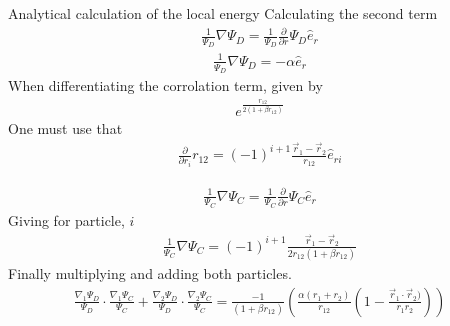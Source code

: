 \documentclass[a4paper, 12pt, titlepage]{article}
\begin{document}
\begin{section}{Analytical calculation of the local energy}
 Calculating the second term
 \begin{align*}
 	\frac{1}{\Psi_D} \nabla \Psi_D = \frac{1}{\Psi_D} \frac{\partial}{\partial r} \Psi_D \hat e_r 
 \end{align*}
 \begin{align}
 	\frac{1}{\Psi_D} \nabla \Psi_D = -\alpha \hat e_r
 \end{align}
 When differentiating the corrolation term, given by
 \begin{align*}
 	e^{\frac{r_{12}}{2\left(1 + \beta r_{12} \right)}}
 \end{align*}
 One must use that
 \begin{align}
 	\frac{\partial}{\partial r_i} r_{12} = (-1)^{i+1} \frac{\vec r_1 - \vec r_2}{r_{12}} \hat e_{ri}
 \end{align}

 \begin{align*}
 	\frac{1}{\Psi_C} \nabla \Psi_C = \frac{1}{\Psi_C} \frac{\partial}{\partial r} \Psi_C \hat e_r 
 \end{align*}
 Giving for particle, $i$
 \begin{align*}
 	\frac{1}{\Psi_C} \nabla \Psi_C = (-1)^{i+1} \frac{\vec r_1 - \vec r_2}{2r_{12} \left(1+\beta r_{12} \right)}
 \end{align*}
 Finally multiplying and adding both particles. 
 \begin{align}
 	\frac{\nabla_1 \Psi_D}{\Psi_D} \cdot \frac{\nabla_1 \Psi_C }{\Psi_C} + \frac{\nabla_2 \Psi_D}{\Psi_D}  \cdot \frac{\nabla_2 \Psi_C}{\Psi_C}  = \frac{-1}{\left(1+\beta r_{12} \right)} \left( \frac{\alpha(r_1 + r_2)}{r_{12}} \left(1 - \frac{\vec r_1 \cdot \vec r_2)}{r_1 r_2} \right)  \right)
 \end{align} 


\end{section}
\end{document}
